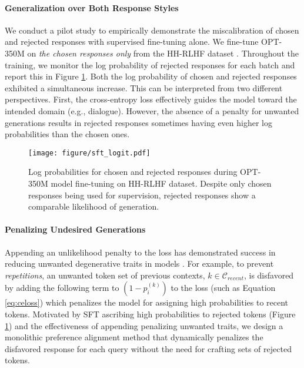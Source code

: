 \paragraph{Generalization over Both Response Styles} We conduct a pilot study to empirically demonstrate the miscalibration of chosen and rejected responses with supervised fine-tuning alone. We fine-tune OPT-350M \citep{zhang2022opt} on \textit{the chosen responses only} from the HH-RLHF dataset \citep{bai2022constitutional}. Throughout the training, we monitor the log probability of rejected responses for each batch and report this in Figure \ref{fig:sft}. Both the log probability of chosen and rejected responses exhibited a simultaneous increase. This can be interpreted from two different perspectives. First, the cross-entropy loss effectively guides the model toward the intended domain (e.g., dialogue). However, the absence of a penalty for unwanted generations results in rejected responses sometimes having even higher log probabilities than the chosen ones.

\begin{figure}[t]
    \centering
    \texttt{[image: figure/sft\_logit.pdf]}
    \caption{Log probabilities for chosen and rejected responses during OPT-350M model fine-tuning on HH-RLHF dataset. Despite only chosen responses being used for supervision, rejected responses show a comparable likelihood of generation.}
    \label{fig:sft}
\end{figure}

\paragraph{Penalizing Undesired Generations} Appending an unlikelihood penalty to the loss has demonstrated success in reducing unwanted degenerative traits in models  \citep{welleck2019neural,li-etal-2020-dont}. For example, to prevent \textit{repetitions}, an unwanted token set of previous contexts, $k \in \mathcal{C}_{recent}$, is disfavored by adding the following term to $(1-p_i^{(k)})$ to the loss (such as Equation \ref{eq:celoss}) which penalizes the model for assigning high probabilities to recent tokens. Motivated by SFT ascribing high probabilities to rejected tokens (Figure \ref{fig:sft}) and the effectiveness of appending penalizing unwanted traits, we design a monolithic preference alignment method that dynamically penalizes the disfavored response for each query without the need for crafting sets of rejected tokens.

